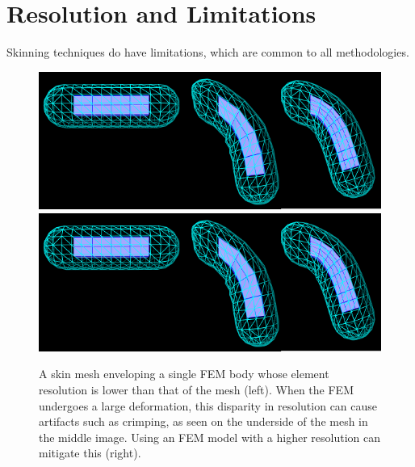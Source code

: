 \section{Resolution and Limitations}

Skinning techniques do have limitations, which are common to all
methodologies.

\begin{figure}[t]
\begin{center}
\iflatexml
 \includegraphics[]{images/FemSkinResAll}
\else
 \includegraphics[width=6in]{images/FemSkinResAll}
\fi
\end{center}
\caption{A skin mesh enveloping a single FEM body whose
element resolution is lower than that of the mesh (left). When
the FEM undergoes a large deformation,
this disparity in resolution can cause artifacts
such as crimping, as seen on the underside of the mesh
in the middle image. Using an FEM model with a higher
resolution can mitigate this (right).}
\label{FemSkinResAll:fig}
\end{figure}

